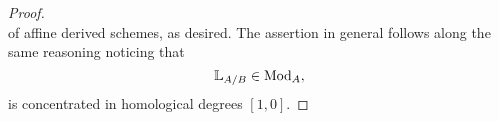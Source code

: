 \documentclass[10pt,a4paper,reqno]{amsart} %
\theoremstyle{plain}
\theoremstyle{definition}
\theoremstyle{remark}
\numberwithin{equation}{section}
\begin{document}
\begin{proof}
\[        \]
     of affine derived schemes, as desired. The assertion in general follows along the same reasoning noticing that
        \[
            \mathbb L_{A/ B} \in \mathrm{Mod}_A,  
        \]
    is concentrated in homological degrees $[1, 0]$.
%
\end{proof}     
\end{document}
